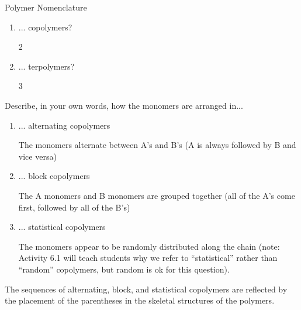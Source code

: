 \begin{activity}{Polymer Nomenclature}
\begin{ctqs}
\begin{enumerate}
			\item ... copolymers?
			
				\begin{solution}[0.25in]
				2
				\end{solution}
			
			\item ... terpolymers?
			
				\begin{solution}[0.25in]
				3
				\end{solution}
			
		\end{enumerate}

	\question Describe, in your own words, how the monomers are arranged in...
	
		\begin{enumerate}
			
			\item ... alternating copolymers
			
				\begin{solution}[0.25in]
				The monomers alternate between A's and B's (A is always followed by B and vice versa)
				\end{solution}
			
			\item ... block copolymers
			
				\begin{solution}[0.25in]
				The A monomers and B monomers are grouped together (all of the A's come first, followed by all of the B's)
				\end{solution}
				
			\item ... statistical copolymers
			
				\begin{solution}[0.25in]
				The monomers appear to be randomly distributed along the chain (note: Activity 6.1 will teach students why we refer to ``statistical'' rather than ``random'' copolymers, but random is ok for this question).
				\end{solution}
				
		\end{enumerate}
		
	\item The sequences of alternating, block, and statistical copolymers are reflected by the placement of the parentheses in the skeletal structures of the polymers.
	
		\begin{enumerate}
		

\end{enumerate}
\end{ctqs}
\end{activity}
